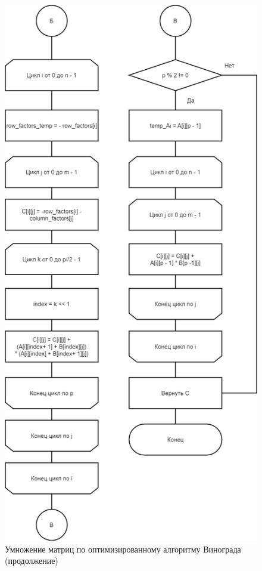 \begin{figure}[H]
	\begin{center}
		\includegraphics[scale=0.5]{img/optimized_winograd2.png}
	\end{center}
	\captionsetup{justification=centering}
	\caption{Умножение матриц по оптимизированному алгоритму Винограда (продолжение)}
	\label{img:optimized_winograd2}
\end{figure}


